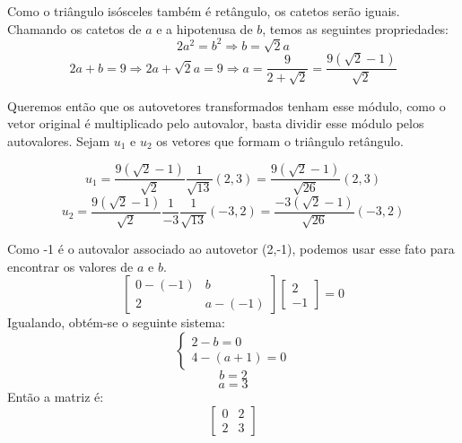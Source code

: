 \documentclass{homework}
\begin{document}
Como o triângulo isósceles também é retângulo, os catetos serão iguais. Chamando os catetos de $a$ e a hipotenusa de $b$, temos as seguintes propriedades:
\[2a^2 = b^2 \Rightarrow b = \sqrt{2}a\]
\[2a + b = 9 \Rightarrow 2a + \sqrt{2}a = 9 \Rightarrow a = \frac{9}{2+\sqrt{2}} = \frac{9(\sqrt{2}-1)}{\sqrt{2}}\]


Queremos então que os autovetores transformados tenham esse módulo, como o vetor original é multiplicado pelo autovalor, basta dividir esse módulo pelos autovalores. Sejam $u_1$ e $u_2$ os vetores que formam o triângulo retângulo.

\[u_1 = \frac{9(\sqrt{2}-1)}{\sqrt{2}}\frac{1}{\sqrt{13}}(2,3) = \frac{9(\sqrt{2}-1)}{\sqrt{26}}(2,3)\]
\[u_2 = \frac{9(\sqrt{2}-1)}{\sqrt{2}}\frac{1}{-3}\frac{1}{\sqrt{13}}(-3,2) = \frac{-3(\sqrt{2}-1)}{\sqrt{26}}(-3,2)\]



\exercise*
Como -1 é o autovalor associado ao autovetor (2,-1), podemos usar esse fato para encontrar os valores de $a$ e $b$.
\[\begin{bmatrix}
0-(-1) & b\\
2 & a-(-1)
\end{bmatrix}
\begin{bmatrix}
2\\
-1
\end{bmatrix} = 0\]
Igualando, obtém-se o seguinte sistema:
\[\begin{cases}
2-b=0\\
4-(a+1)=0
\end{cases}\]
\[b=2\]
\[a=3\]
Então a matriz é:
\[\begin{bmatrix}
0 & 2\\
2 & 3
\end{bmatrix}\]
\end{document}
